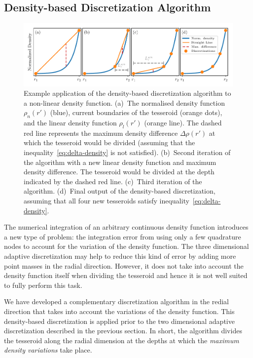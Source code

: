 \documentclass[extra, referee]{gji}
\begin{document}
\subsection{Density-based Discretization Algorithm}

\begin{figure}
\centering
\includegraphics[width=\linewidth]
    {figures/density-based-discretization-algorithm.pdf}
\caption{
    Example application of the density-based discretization algorithm to a non-linear
    density function.
    (a)~The normalised density function $\rho_n(r')$ (blue), current boundaries of the
    tesseroid (orange dots), and the linear density function $\rho_l(r')$ (orange line).
    The dashed red line represents the maximum density difference $\Delta \rho (r')$ at
    which the tesseroid would be divided (assuming that the
    inequality~\ref{eq:delta-density} is not satisfied).
    (b)~Second iteration of the algorithm with a new linear density function and maximum
    density difference. The tesseroid would be divided at the depth indicated by the
    dashed red line.
    (c)~Third iteration of the algorithm.
    (d)~Final output of the density-based discretization, assuming that all four new
    tesseroids satisfy inequality~\ref{eq:delta-density}.
}
\label{fig:density-discretization-algorithm}
\end{figure}

The numerical integration of an arbitrary continuous density function introduces a new
type of problem: the integration error from using only a few quadrature nodes to account
for the variation of the density function.
The three dimensional adaptive discretization may help to reduce this kind of error by
adding more point masses in the radial direction.
However, it does not take into account the density function itself when dividing the
tesseroid and hence it is not well suited to fully perform this task.

We have developed a complementary discretization algorithm in the redial direction that
takes into account the variations of the density function.
This density-based discretization is applied prior to the two dimensional adaptive
discretization described in the previous section.
In short, the algorithm divides the tesseroid along the radial dimension at the
depths at which the \emph{maximum density variations} take place.
\end{document}
